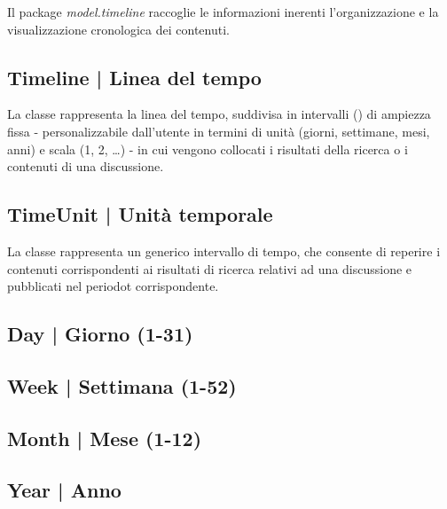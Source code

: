 \documentclass[10pt,a4paper,headinclude,footinclude,hidelinks]{scrreprt} %
\begin{document}
	Il package \textit{model.timeline} raccoglie le informazioni inerenti l'organizzazione e la visualizzazione cronologica dei contenuti.

	\subsection[Timeline]{Timeline | Linea del tempo}
	\label{sec:stage:design:model.timeline:timeline}
	La classe \textit{} rappresenta la linea del tempo, suddivisa in intervalli (\textit{}) di ampiezza fissa - personalizzabile dall'utente in termini di unità (giorni, settimane, mesi, anni) e scala (1, 2, \ldots) - in cui vengono collocati i risultati della ricerca o i contenuti di una discussione.

	\subsection[TimeUnit]{TimeUnit | Unità temporale}
	\label{sec:stage:design:model.timeline:time-unit}
	La classe \textit{} rappresenta un generico intervallo di tempo, che consente di reperire i contenuti corrispondenti ai risultati di ricerca relativi ad una discussione e pubblicati nel periodot corrispondente.

	\subsection[Day]{Day | Giorno (1-31)}
	\label{sec:stage:design:model.timeline:time-day}

	\subsection[Week]{Week | Settimana (1-52)}
	\label{sec:stage:design:model.timeline:time-week}

	\subsection[Month]{Month | Mese (1-12)}
	\label{sec:stage:design:model.timeline:time-month}

	\subsection[Year]{Year | Anno}
	\label{sec:stage:design:model.timeline:time-year}
\end{document}
